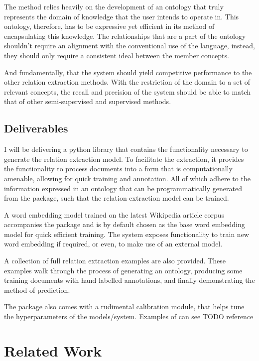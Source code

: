 \documentclass[11pt]{article} %
\begin{document}
The method relies heavily on the development of an ontology that truly represents the domain of knowledge that the user intends to operate in. This ontology, therefore, has to be expressive yet efficient in its method of encapsulating this knowledge. The relationships that are a part of the ontology shouldn’t require an alignment with the conventional use of the language, instead, they should only require a consistent ideal between the member concepts.

And fundamentally, that the system should yield competitive performance to the other relation extraction methods. With the restriction of the domain to a set of relevant concepts, the recall and precision of the system should be able to match that of other semi-supervised and supervised methods.

\subsection{Deliverables}

I will be delivering a python library that contains the functionality necessary to generate the relation extraction model. To facilitate the extraction, it provides the functionality to process documents into a form that is computationally amenable, allowing for quick training and annotation. All of which adhere to the information expressed in an ontology that can be programmatically generated from the package, such that the relation extraction model can be trained.

A word embedding model trained on the latest Wikipedia article corpus accompanies the package and is by default chosen as the base word embedding model for quick efficient training. The system exposes functionality to train new word embedding if required, or even, to make use of an external model.

A collection of full relation extraction examples are also provided. These examples walk through the process of generating an ontology, producing some training documents with hand labelled annotations, and finally demonstrating the method of prediction.

The package also comes with a rudimental calibration module, that helps tune the hyperparameters of the models/system. Examples of can see TODO reference

\section{Related Work}
\end{document}
